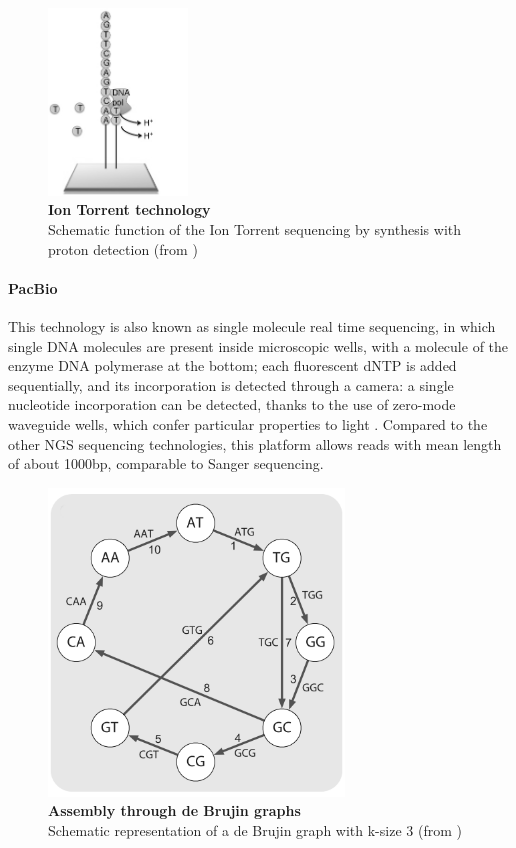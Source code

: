 \begin{figure}[!b]
	\center
    \includegraphics[width=0.33\textwidth]{figures/Introduction/thesis_8}
	\caption{\label{fig:ion}\textbf{Ion Torrent technology}\\
			Schematic function of the Ion Torrent sequencing by synthesis with proton detection (from \cite{ion})}
\end{figure}

\paragraph{PacBio} This technology is also known as single molecule real time sequencing, in which single DNA molecules are present inside microscopic wells, with a molecule of the enzyme DNA polymerase at the bottom; each fluorescent dNTP is added sequentially, and its incorporation is detected through a camera: a single nucleotide incorporation can be detected, thanks to the use of zero-mode waveguide wells, which confer particular properties to light \cite{eid2009real}. Compared to the other NGS sequencing technologies, this platform allows reads with mean length of about 1000bp, comparable to Sanger sequencing.

\begin{figure}[!htb]
	\center
    \includegraphics[width=0.7\textwidth]{figures/Introduction/thesis_9}
	\caption{\label{fig:debrujin}\textbf{Assembly through de Brujin graphs}\\
			Schematic representation of a de Brujin graph with k-size 3 (from \cite{compeau2011apply})}
\end{figure}

